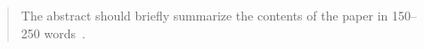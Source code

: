 
\begin{abstract}
    The abstract should briefly summarize the contents of the paper in
    150--250 words~\cite{ref_book1}.


\end{abstract}